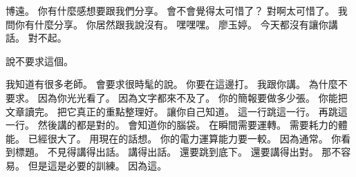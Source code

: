 \hypertarget{w01:cue:3762}{}博遠。
\hypertarget{w01:cue:3763}{}你有什麼感想要跟我們分享。
\hypertarget{w01:cue:3764}{}會不會覺得太可惜了？
\hypertarget{w01:cue:3765}{}對啊太可惜了。
\hypertarget{w01:cue:3766}{}我問你有什麼分享。
\hypertarget{w01:cue:3767}{}你居然跟我說沒有。
\hypertarget{w01:cue:3768}{}嘿嘿嘿。
\hypertarget{w01:cue:3769}{}廖玉婷。
\hypertarget{w01:cue:3770}{}今天都沒有讓你講話。
\hypertarget{w01:cue:3771}{}對不起。

\hypertarget{w01:cue:3772}{}說不要求這個。

\hypertarget{w01:cue:3773}{}我知道有很多老師。
\hypertarget{w01:cue:3774}{}會要求很時髦的說。
\hypertarget{w01:cue:3775}{}你要在這邊打。
\hypertarget{w01:cue:3776}{}我跟你講。
\hypertarget{w01:cue:3777}{}為什麼不要求。
\hypertarget{w01:cue:3778}{}因為你光光看了。
\hypertarget{w01:cue:3779}{}因為文字都來不及了。
\hypertarget{w01:cue:3780}{}你的簡報要做多少張。
\hypertarget{w01:cue:3781}{}你能把文章讀完。
\hypertarget{w01:cue:3782}{}把它真正的重點整理好。
\hypertarget{w01:cue:3783}{}讓你自己知道。
\hypertarget{w01:cue:3784}{}這一行跳這一行。
\hypertarget{w01:cue:3785}{}再跳這一行。
\hypertarget{w01:cue:3786}{}然後講的都是對的。
\hypertarget{w01:cue:3787}{}會知道你的腦袋。
\hypertarget{w01:cue:3788}{}在瞬間需要運轉。
\hypertarget{w01:cue:3789}{}需要耗力的體能。
\hypertarget{w01:cue:3790}{}已經很大了。
\hypertarget{w01:cue:3791}{}用現在的話想。
\hypertarget{w01:cue:3792}{}你的電力運算能力要一較。
\hypertarget{w01:cue:3793}{}因為通常。
\hypertarget{w01:cue:3794}{}你看到標題。
\hypertarget{w01:cue:3795}{}不見得講得出話。
\hypertarget{w01:cue:3796}{}講得出話。
\hypertarget{w01:cue:3797}{}還要跳到底下。
\hypertarget{w01:cue:3798}{}還要講得出對。
\hypertarget{w01:cue:3799}{}那不容易。
\hypertarget{w01:cue:3800}{}但是這是必要的訓練。
\hypertarget{w01:cue:3801}{}因為這。

